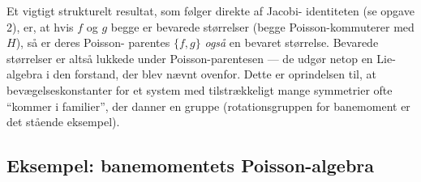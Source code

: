 \begin{bemaerkning}
Et vigtigt strukturelt resultat, som følger direkte af Jacobi-
identiteten (se opgave 2), er, at hvis $f$ og $g$ begge er bevarede
størrelser (begge Poisson-kommuterer med $H$), så er deres Poisson-
parentes $\{f,g\}$ \emph{også} en bevaret størrelse. Bevarede
størrelser er altså lukkede under Poisson-parentesen — de udgør netop
en Lie-algebra i den forstand, der blev nævnt ovenfor. Dette er
oprindelsen til, at bevægelseskonstanter for et system med
tilstrækkeligt mange symmetrier ofte ``kommer i familier'', der danner
en gruppe (rotationsgruppen for banemoment er det stående eksempel).
\end{bemaerkning}

\subsection{Eksempel: banemomentets Poisson-algebra}

